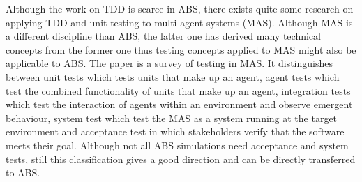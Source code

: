 Although the work on TDD is scarce in ABS, there exists quite some research on applying TDD and unit-testing to multi-agent systems (MAS). Although MAS is a different discipline than ABS, the latter one has derived many technical concepts from the former one thus testing concepts applied to MAS might also be applicable to ABS. The paper \cite{nguyen_testing_2011} is a survey of testing in MAS. It distinguishes between unit tests which tests units that make up an agent, agent tests which test the combined functionality of units that make up an agent, integration tests which test the interaction of agents within an environment and observe emergent behaviour, system test which test the MAS as a system running at the target environment and acceptance test in which stakeholders verify that the software meets their goal. Although not all ABS simulations need acceptance and system tests, still this classification gives a good direction and can be directly transferred to ABS. 

